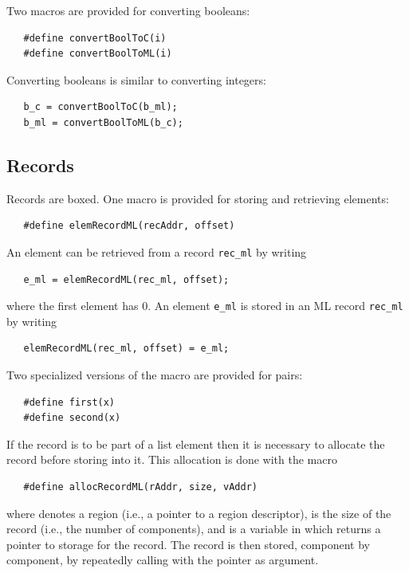 \documentclass[12pt]{book}
\begin{document}
Two macros are provided for converting booleans:
%
%
\begin{verbatim}
   #define convertBoolToC(i)
   #define convertBoolToML(i)
\end{verbatim}
Converting booleans is similar to converting integers:
\begin{verbatim}
   b_c = convertBoolToC(b_ml);
   b_ml = convertBoolToML(b_c);
\end{verbatim}

\subsection{Records}
Records are boxed. One macro is provided for storing and retrieving
elements:
%
\begin{verbatim}
   #define elemRecordML(recAddr, offset)
\end{verbatim}
An element can be retrieved from a record \verb|rec_ml| by writing 
\begin{verbatim}
   e_ml = elemRecordML(rec_ml, offset);
\end{verbatim}
where the first element has  0. An element \verb|e_ml|
is stored in an ML record \verb|rec_ml| by writing
\begin{verbatim}
   elemRecordML(rec_ml, offset) = e_ml;
\end{verbatim}
Two specialized versions of the  macro are
provided for 
%
%
pairs:
\begin{verbatim}
   #define first(x)
   #define second(x)
\end{verbatim}

If the record is to be part of a list element then it is necessary to allocate the record
before storing into it. This allocation is done with the macro
%
\begin{verbatim}
   #define allocRecordML(rAddr, size, vAddr)
\end{verbatim}
where  denotes a region (i.e., a pointer to a region
descriptor),  is the size of the record (i.e., the number
of components), and  is a variable in which
 returns a pointer to storage for the record. The
record is then stored, component by component, by repeatedly calling
 with the pointer  as argument.
\end{document}
